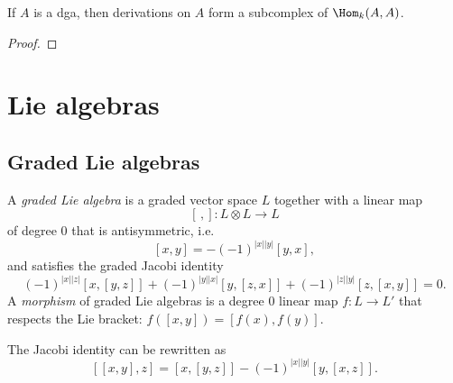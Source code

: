 \documentclass[english,no-theorem-numbers]{short-notes}
\newcommand\degree[1]{|#1|}
\begin{document}
\begin{Prop}
    If $A$ is a dga, then derivations on $A$ form a subcomplex of $\Hom_k(A,A)$.
\end{Prop}

\begin{proof}
\end{proof}

\section{Lie algebras}

\subsection{Graded Lie algebras}

A \emph{graded Lie algebra} is a graded vector space $L$ together with a linear map
\[
[\,,]\colon L \otimes L → L
\]
of degree $0$ that is antisymmetric, i.e.
\[
[x,y] = -(-1)^{\degree x \degree y}[y,x],
\]
and satisfies the graded Jacobi identity
\[
(-1)^{\degree x\degree z} [x,[y,z]] +
(-1)^{\degree y\degree x} [y,[z,x]] +
(-1)^{\degree z\degree y} [z,[x,y]] = 0.
\]
A \emph{morphism} of graded Lie algebras is a degree $0$ linear map $f\colon L → L'$ that respects the Lie bracket: $f([x,y]) = [f(x),f(y)]$.

The Jacobi identity can be rewritten as
\[
[ [x,y],z] = [x,[y,z]] - (-1)^{\degree x \degree y}[y,[x,z]].
\]
\end{document}
